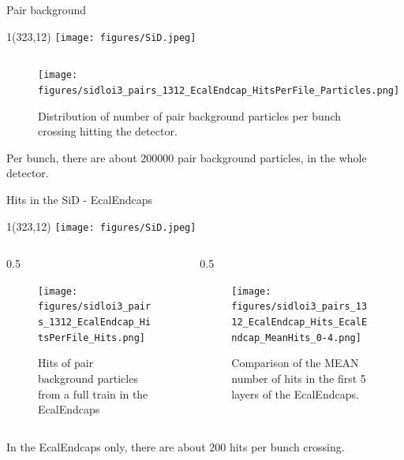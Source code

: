 \documentclass[xcolor={dvipsnames}]{beamer}
\newcommand{\sidlogo}{
  \setlength{\TPHorizModule}{1pt}
  \setlength{\TPVertModule}{1pt}
  \begin{textblock}{1}(323,12)
   \texttt{[image: figures/SiD.jpeg]}
  \end{textblock}
  }
\begin{document}
\begin{frame}{Pair background}
\sidlogo
 \begin{figure}
 	\begin{columns}
        \begin{flushright}
        \texttt{[image: figures/sidloi3\_pairs\_1312\_EcalEndcap\_HitsPerFile\_Particles.png]}
        \end{flushright}
        \begin{flushleft}
        \caption{\small Distribution of number of pair background particles per bunch crossing hitting the detector.}
        \end{flushleft}
      \end{columns}
\end{figure}
Per bunch, there are about \num{200000} pair background particles, in the whole detector.\\
\end{frame}


\begin{frame}[label=HitsEcalEndcaps]{Hits in the SiD - EcalEndcaps}
\sidlogo
\begin{columns}
\begin{column}[T]{0.5\textwidth}
\begin{figure}
\centering
\texttt{[image: figures/sidloi3\_pairs\_1312\_EcalEndcap\_HitsPerFile\_Hits.png]}
\caption{\small Hits of pair background particles from a full train in the EcalEndcaps}
\end{figure}
\end{column}
\begin{column}[T]{0.5\textwidth}
\begin{figure}
\centering
\texttt{[image: figures/sidloi3\_pairs\_1312\_EcalEndcap\_Hits\_EcalEndcap\_MeanHits\_0-4.png]}
\caption{\small Comparison of the MEAN number of hits in the first 5 layers of the EcalEndcaps.}
\end{figure}
\end{column}
\end{columns}
In the EcalEndcaps only, there are about 200 hits per bunch crossing.\\
\end{frame}
\end{document}
